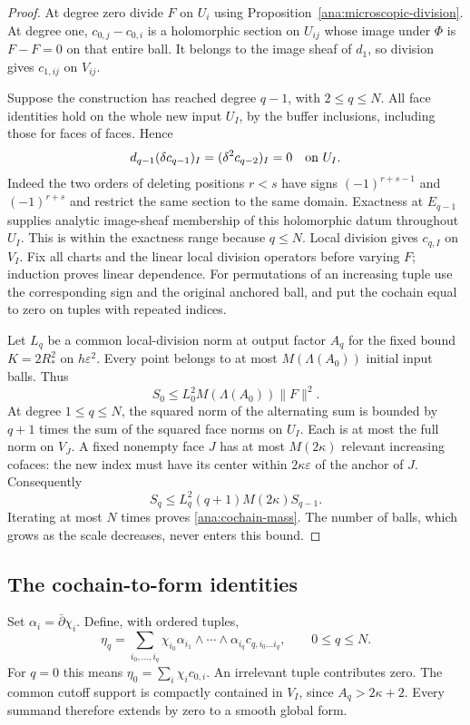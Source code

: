 \documentclass[11pt,reqno]{amsart}
\numberwithin{equation}{section}
\theoremstyle{definition}
\theoremstyle{remark}
\begin{document}
\begin{proof}
At degree zero divide $F$ on $U_i$ using
Proposition~\ref{ana:microscopic-division}.  At degree one,
$c_{0,j}-c_{0,i}$ is a holomorphic section on $U_{ij}$ whose image
under $\Phi$ is $F-F=0$ on that entire ball.  It belongs to the
image sheaf of $d_1$, so division gives $c_{1,ij}$ on $V_{ij}$.

Suppose the construction has reached degree $q-1$, with $2\leq q\leq N$.
All face identities hold on the whole new input $U_I$, by the
buffer inclusions, including those for faces of faces.  Hence
\[
 d_{q-1}(\delta c_{q-1})_I
 =(\delta^2c_{q-2})_I=0\quad\hbox{on }U_I.
\]
Indeed the two orders of deleting positions $r<s$ have signs
$(-1)^{r+s-1}$ and $(-1)^{r+s}$ and restrict the same section to
the same domain. Exactness at $E_{q-1}$ supplies analytic image-sheaf
membership of this holomorphic datum throughout $U_I$. This is within
the exactness range because $q\leq N$.  Local division gives
$c_{q,I}$ on $V_I$.  Fix all charts and the linear local division
operators before varying $F$; induction proves linear dependence.
For permutations of an increasing tuple use the corresponding sign
and the original anchored ball, and put the cochain equal to zero
on tuples with repeated indices.

Let $L_q$ be a common local-division norm at output factor $A_q$
for the fixed bound $K=2R_*^2$ on $h\varepsilon^2$.  Every point belongs to at most
$M(\Lambda(A_0))$ initial input balls.  Thus
\[
 S_0\leq L_0^2M(\Lambda(A_0))\|F\|^2.
\]
At degree $1\leq q\leq N$, the squared norm of the alternating sum is
bounded by $q+1$ times the sum of the squared face norms on $U_I$.
Each is at most the full norm on $V_J$.  A fixed nonempty face $J$
has at most $M(2\kappa)$ relevant increasing cofaces: the new
index must have its center within $2\kappa\varepsilon$ of the
anchor of $J$.  Consequently
\[
 S_q\leq L_q^2(q+1)M(2\kappa)S_{q-1}.
\]
Iterating at most $N$ times proves \eqref{ana:cochain-mass}.
The number of balls, which grows as the scale decreases, never
enters this bound.
\end{proof}

\subsection{The cochain-to-form identities}

Set $\alpha_i=\bar\partial\chi_i$.  Define, with ordered tuples,
\begin{equation}\label{ana:eta-definition}
 \eta_q=
 \sum_{i_0,\ldots,i_q}
 \chi_{i_0}\alpha_{i_1}\wedge\cdots\wedge\alpha_{i_q}
 c_{q,i_0\ldots i_q},\qquad 0\leq q\leq N.
\end{equation}
For $q=0$ this means $\eta_0=\sum_i\chi_ic_{0,i}$.
An irrelevant tuple contributes zero.  The common cutoff support
is compactly contained in $V_I$, since $A_q>2\kappa+2$.
Every summand therefore extends by zero to a smooth global form.
\end{document}
